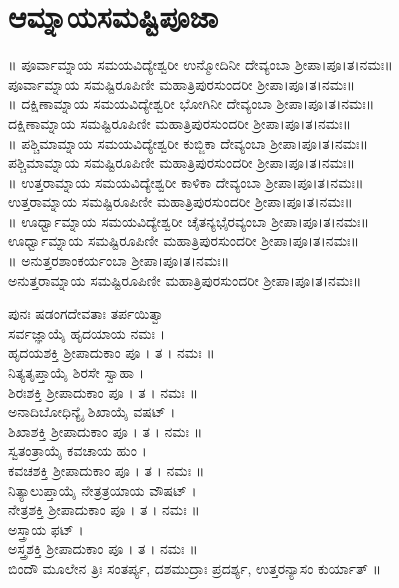 \section{ಆಮ್ನಾಯಸಮಷ್ಟಿಪೂಜಾ}
॥ ಪೂರ್ವಾಮ್ನಾಯ ಸಮಯವಿದ್ಯೇಶ್ವರೀ ಉನ್ಮೋದಿನೀ ದೇವ್ಯಂಬಾ ಶ್ರೀಪಾ।ಪೂ।ತ।ನಮಃ॥\\
 ಪೂರ್ವಾಮ್ನಾಯ ಸಮಷ್ಟಿರೂಪಿಣೀ ಮಹಾತ್ರಿಪುರಸುಂದರೀ ಶ್ರೀಪಾ।ಪೂ।ತ।ನಮಃ॥\\
॥ ದಕ್ಷಿಣಾಮ್ನಾಯ ಸಮಯವಿದ್ಯೇಶ್ವರೀ ಭೋಗಿನೀ ದೇವ್ಯಂಬಾ ಶ್ರೀಪಾ।ಪೂ।ತ।ನಮಃ॥\\
 ದಕ್ಷಿಣಾಮ್ನಾಯ ಸಮಷ್ಟಿರೂಪಿಣೀ ಮಹಾತ್ರಿಪುರಸುಂದರೀ ಶ್ರೀಪಾ।ಪೂ।ತ।ನಮಃ॥\\
॥ ಪಶ್ಚಿಮಾಮ್ನಾಯ ಸಮಯವಿದ್ಯೇಶ್ವರೀ ಕುಬ್ಜಿಕಾ ದೇವ್ಯಂಬಾ ಶ್ರೀಪಾ।ಪೂ।ತ।ನಮಃ॥\\
 ಪಶ್ಚಿಮಾಮ್ನಾಯ ಸಮಷ್ಟಿರೂಪಿಣೀ ಮಹಾತ್ರಿಪುರಸುಂದರೀ ಶ್ರೀಪಾ।ಪೂ।ತ।ನಮಃ॥\\
॥ ಉತ್ತರಾಮ್ನಾಯ ಸಮಯವಿದ್ಯೇಶ್ವರೀ ಕಾಳಿಕಾ ದೇವ್ಯಂಬಾ ಶ್ರೀಪಾ।ಪೂ।ತ।ನಮಃ॥\\
 ಉತ್ತರಾಮ್ನಾಯ ಸಮಷ್ಟಿರೂಪಿಣೀ ಮಹಾತ್ರಿಪುರಸುಂದರೀ ಶ್ರೀಪಾ।ಪೂ।ತ।ನಮಃ॥\\
॥ ಊರ್ಧ್ವಾಮ್ನಾಯ ಸಮಯವಿದ್ಯೇಶ್ವರೀ ಚೈತನ್ಯಭೈರವ್ಯಂಬಾ ಶ್ರೀಪಾ।ಪೂ।ತ।ನಮಃ॥\\
 ಊರ್ಧ್ವಾಮ್ನಾಯ ಸಮಷ್ಟಿರೂಪಿಣೀ ಮಹಾತ್ರಿಪುರಸುಂದರೀ ಶ್ರೀಪಾ।ಪೂ।ತ।ನಮಃ॥\\
॥ ಅನುತ್ತರಶಾಂಕರ್ಯಂಬಾ ಶ್ರೀಪಾ।ಪೂ।ತ।ನಮಃ॥\\
 ಅನುತ್ತರಾಮ್ನಾಯ ಸಮಷ್ಟಿರೂಪಿಣೀ ಮಹಾತ್ರಿಪುರಸುಂದರೀ ಶ್ರೀಪಾ।ಪೂ।ತ।ನಮಃ॥

ಪುನಃ ಷಡಂಗದೇವತಾಃ ತರ್ಪಯಿತ್ವಾ\\
 ಸರ್ವಜ್ಞಾಯೈ ಹೃದಯಾಯ ನಮಃ ।\\ ಹೃದಯಶಕ್ತಿ ಶ್ರೀಪಾದುಕಾಂ ಪೂ । ತ । ನಮಃ ॥\\
 ನಿತ್ಯತೃಪ್ತಾಯೈ ಶಿರಸೇ ಸ್ವಾಹಾ । \\ಶಿರಃಶಕ್ತಿ ಶ್ರೀಪಾದುಕಾಂ ಪೂ । ತ । ನಮಃ ॥\\
 ಅನಾದಿಬೋಧಿನ್ಯೈ ಶಿಖಾಯೈ ವಷಟ್ ।\\ ಶಿಖಾಶಕ್ತಿ ಶ್ರೀಪಾದುಕಾಂ ಪೂ । ತ । ನಮಃ ॥\\
 ಸ್ವತಂತ್ರಾಯೈ ಕವಚಾಯ ಹುಂ । \\ಕವಚಶಕ್ತಿ ಶ್ರೀಪಾದುಕಾಂ ಪೂ । ತ । ನಮಃ ॥\\
 ನಿತ್ಯಾಲುಪ್ತಾಯೈ ನೇತ್ರತ್ರಯಾಯ ವೌಷಟ್ । \\ನೇತ್ರಶಕ್ತಿ ಶ್ರೀಪಾದುಕಾಂ ಪೂ । ತ । ನಮಃ ॥\\
 ಅಸ್ತ್ರಾಯ ಫಟ್ ।\\ ಅಸ್ತ್ರಶಕ್ತಿ ಶ್ರೀಪಾದುಕಾಂ ಪೂ । ತ । ನಮಃ ॥\\
ಬಿಂದೌ ಮೂಲೇನ ತ್ರಿಃ ಸಂತರ್ಪ್ಯ, ದಶಮುದ್ರಾಃ ಪ್ರದರ್ಶ್ಯ, ಉತ್ತರನ್ಯಾಸಂ ಕುರ್ಯಾತ್ ॥

